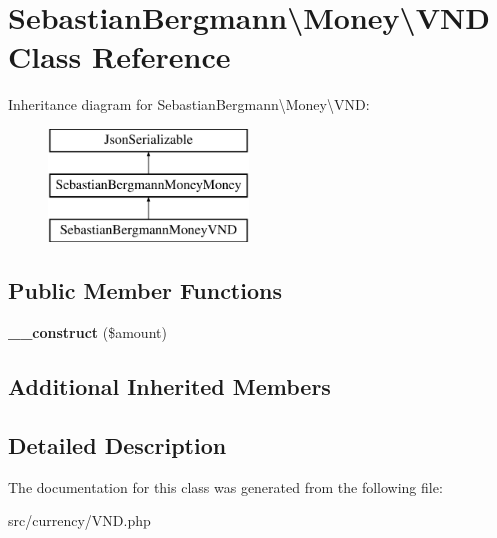 \hypertarget{classSebastianBergmann_1_1Money_1_1VND}{}\section{Sebastian\+Bergmann\textbackslash{}Money\textbackslash{}V\+N\+D Class Reference}
\label{classSebastianBergmann_1_1Money_1_1VND}
Inheritance diagram for Sebastian\+Bergmann\textbackslash{}Money\textbackslash{}V\+N\+D\+:\begin{figure}[H]
\begin{center}
\leavevmode
\includegraphics[height=3.000000cm]{classSebastianBergmann_1_1Money_1_1VND}
\end{center}
\end{figure}
\subsection*{Public Member Functions}
\begin{DoxyCompactItemize}
\item 
\hypertarget{classSebastianBergmann_1_1Money_1_1VND_ab9327b5e7fe2e5cb0a3f39abf740bc26}{}{\bfseries \+\_\+\+\_\+construct} (\$amount)\label{classSebastianBergmann_1_1Money_1_1VND_ab9327b5e7fe2e5cb0a3f39abf740bc26}

\end{DoxyCompactItemize}
\subsection*{Additional Inherited Members}


\subsection{Detailed Description}


The documentation for this class was generated from the following file\+:\begin{DoxyCompactItemize}
\item 
src/currency/V\+N\+D.\+php\end{DoxyCompactItemize}
